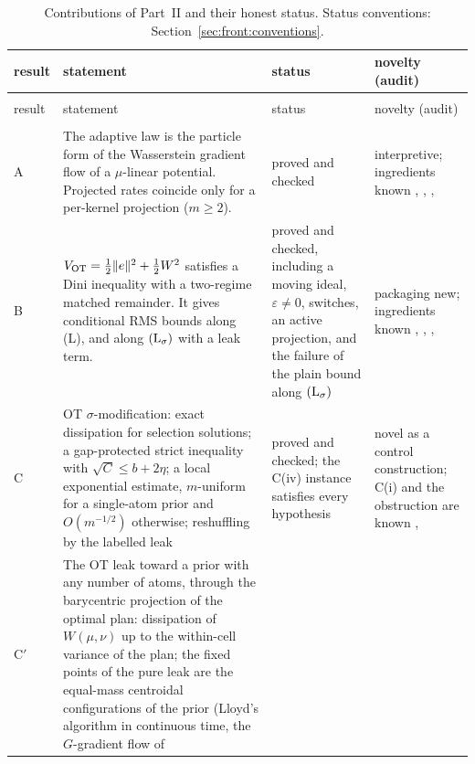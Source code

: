 {\footnotesize
\setlength{\tabcolsep}{3pt}
\begin{longtable}{@{}>{\raggedright\arraybackslash}p{}>{\raggedright\arraybackslash}p{}%
>{\raggedright\arraybackslash}p{}>{\raggedright\arraybackslash}p{}@{}}
\caption{Contributions of Part~II and their honest status. Status conventions:
Section~\ref{sec:front:conventions}.}\label{tab:front:contrib}\\
\toprule
result & statement & status & novelty (audit)\\
\midrule
\endfirsthead
\multicolumn{4}{@{}l}{\emph{Table~\ref{tab:front:contrib}, continued}}\\
\toprule
result & statement & status & novelty (audit)\\
\midrule
\endhead
\midrule
\multicolumn{4}{r@{}}{\emph{continued on the next page}}\\
\endfoot
\bottomrule
\endlastfoot
A & The adaptive law is the particle form of the Wasserstein gradient flow of a $\mu$-linear potential. Projected
rates coincide only for a per-kernel projection ($m \ge 2$).
& proved and checked
& interpretive; ingredients known \cite{R29}, \cite{R41}, \cite{R46}, \cite{R25}\\
\addlinespace[0.5pt]
B & $V_{\mathrm{OT}} = \frac12\lVert e\rVert^2 + \frac12 W^2$ satisfies a Dini inequality with a two-regime matched remainder. It
gives conditional RMS bounds along (L), and along $(\mathrm{L}_\sigma)$ with a leak term.
& proved and checked, including a moving ideal, $\varepsilon \ne 0$, switches, an active projection, and the failure
of the plain bound along $(\mathrm{L}_\sigma)$
& packaging new; ingredients known \cite{R62}, \cite{R64}, \cite{R20}, \cite{R49}\\
\addlinespace[0.5pt]
C & OT $\sigma$-modification: exact dissipation for selection solutions; a gap-protected strict inequality with
$\sqrt{C} \le b + 2\eta$; a local exponential estimate, $m$-uniform for a single-atom prior and $O(m^{-1/2})$
otherwise; reshuffling by the labelled leak
& proved and checked; the C(iv) instance satisfies every hypothesis
& novel as a control construction; C(i) and the obstruction are known \cite{R71}, \cite{R73}\\
\addlinespace[0.5pt]
C$'$ & The OT leak toward a prior with any number of atoms, through the barycentric projection of the optimal plan:
dissipation of $W(\mu,\nu)$ up to the within-cell variance of the plan; the fixed points of the pure leak are the
equal-mass centroidal configurations of the prior (Lloyd's algorithm in continuous time, the $G$-gradient flow of

\end{longtable}}
